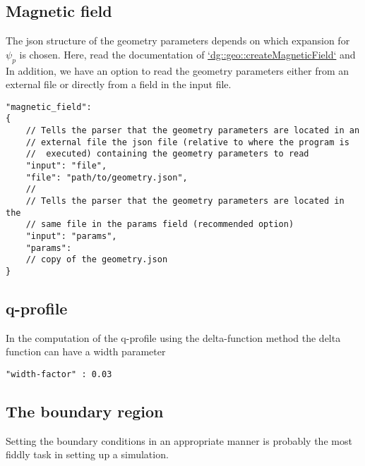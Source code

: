 \subsection{Magnetic field} \label{sec:geometry_file}
The json structure of the geometry parameters depends on which expansion for
$\psi_p$ is chosen. Here, read the documentation of
\href{https://mwiesenberger.github.io/feltor/geometries/html/group__geom.html#gaa0da1d1c2db65f1f4b28d77307ad238b}{`dg::geo::createMagneticField`} and \cite{Cerfon2010}
In addition, we have an option to read the geometry parameters either from an external
file or directly from a field in the input file.
\begin{verbatim}
"magnetic_field":
{
    // Tells the parser that the geometry parameters are located in an
    // external file the json file (relative to where the program is
    //  executed) containing the geometry parameters to read
    "input": "file",
    "file": "path/to/geometry.json",
    //
    // Tells the parser that the geometry parameters are located in the
    // same file in the params field (recommended option)
    "input": "params",
    "params":
    // copy of the geometry.json
}
\end{verbatim}
\noindent
\subsection{q-profile}

In the computation of the q-profile using the delta-function method the delta function can have
a width parameter
\begin{verbatim}
"width-factor" : 0.03
\end{verbatim}

\subsection{The boundary region} \label{sec:boundary}
Setting the boundary conditions in an appropriate manner is probably the most
fiddly task in setting up a simulation.
